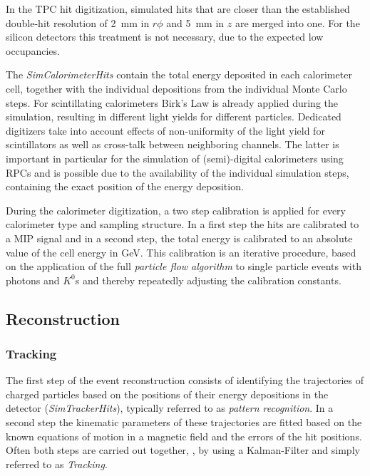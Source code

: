 In the TPC hit digitization, simulated hits that are closer than the established double-hit resolution of 2~mm in $r\phi$ and 5~mm
in $z$ are merged into one. For the silicon detectors this treatment is not necessary, due to the expected low occupancies.

The \emph{SimCalorimeterHits} contain the total energy deposited in each calorimeter cell, together with the individual depositions
from the individual Monte Carlo steps. For scintillating calorimeters
Birk's Law is already applied during the simulation, resulting in different light yields for different
particles.  Dedicated digitizers take into account effects of non-uniformity of the light yield
for scintillators as well as cross-talk between neighboring channels. The latter is important in particular for the simulation of
(semi)-digital calorimeters using RPCs and is possible due to the availability of the individual simulation steps, containing
the exact position of the energy deposition.

During the calorimeter digitization, a two step calibration is applied for every calorimeter type and sampling structure. In a first step
the hits are calibrated to a MIP signal and in a second step, the total energy is calibrated to an absolute value of the
cell energy in  GeV. This calibration is an iterative procedure, based on the application of the full
\emph{particle flow algorithm }  to single particle events with photons and $K^0$s and thereby
repeatedly adjusting the calibration constants.


  
\subsection{\label{sub:sw-reco}Reconstruction}

\subsubsection{Tracking} 

The first step of the event reconstruction consists of identifying the trajectories of charged particles based on the positions of their
energy depositions in the detector (\emph{SimTrackerHits}), typically referred to as \emph{pattern recognition}. In a second step the
kinematic parameters of these trajectories are fitted based on the known equations of motion in a magnetic field and the errors of the
hit positions. Often both steps are carried out together, \eg, by using a Kalman-Filter and simply referred to as \emph{Tracking}.

